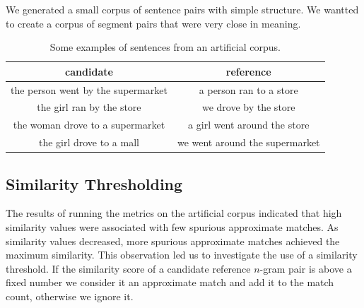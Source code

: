 We generated a small corpus of sentence pairs with simple structure. 
We wantted to create a corpus of segment pairs that were very close in meaning. 

\begin{table}[h]
  \centering
  \begin{tabular}{|c||c|}
\hline
    candidate & reference \\
\hline
the person went by the supermarket & a person ran to a store \\
the girl ran by the store & we drove by the store \\
the woman drove to a supermarket & a girl went around the store \\
the girl drove to a mall & we went around the supermarket \\
\hline
  \end{tabular}
  \caption{Some examples of sentences from an artificial corpus.}
  \label{tab:sentencexamples}
\end{table}

\subsection{Similarity Thresholding}
\label{sec:simthresh}


The results of running the metrics on the artificial corpus indicated that high similarity values were associated with few spurious approximate matches. 
As similarity values decreased, more spurious approximate matches achieved the maximum similarity. 
This observation led us to investigate the use of a similarity threshold. 
If the similarity score of a candidate reference $n$-gram pair is above a fixed number we consider it an approximate match and add it to the match count, otherwise we ignore it. 


